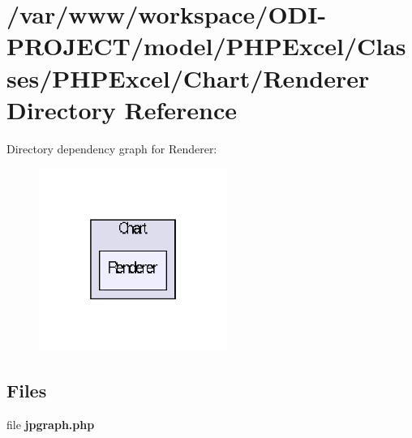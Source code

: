 \section{/var/www/workspace/\+O\+D\+I-\/\+P\+R\+O\+J\+E\+C\+T/model/\+P\+H\+P\+Excel/\+Classes/\+P\+H\+P\+Excel/\+Chart/\+Renderer Directory Reference}
\label{dir_b787502c10c3f23d4452b13c3a41d659}
Directory dependency graph for Renderer\+:\nopagebreak
\begin{figure}[H]
\begin{center}
\leavevmode
\includegraphics[width=174pt]{dir_b787502c10c3f23d4452b13c3a41d659_dep}
\end{center}
\end{figure}
\subsection*{Files}
\begin{DoxyCompactItemize}
\item 
file {\bfseries jpgraph.\+php}
\end{DoxyCompactItemize}
